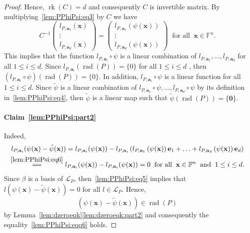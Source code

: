 \documentclass{elsarticle}
\DeclareMathOperator{\rk}{rk}
\DeclareMathOperator{\rad}{rad}
\def\F{{\mathbb F}}
\def\L{{\mathcal L}}
\theoremstyle{definition}
\numberwithin{equation}{section}
\begin{document}
\begin{proof}
Hence, $\rk(C) = d$ and consequently $C$ is invertible matrix. By multiplying~\eqref{lem:PPhiPsi:eq3} by $C$ we have
\[
C^{-1}\begin{pmatrix}
l_{P,\mathbf a_1}(\mathbf x)\\
\vdots\\
l_{P,\mathbf a_d}(\mathbf x)
\end{pmatrix}
=  
\begin{pmatrix}
l_{P,\mathbf a_1}(\psi(\mathbf x))\\
\vdots\\
l_{P,\mathbf a_d} (\psi(\mathbf x))
\end{pmatrix}
\;\;\mbox{for all}\;\;\mathbf x \in \F^n.
\]
This implies that the function $l_{P,\mathbf a_i}\circ \psi$ is a linear combination of $l_{P,\mathbf a_1}, \ldots, l_{P,\mathbf a_d}$ for all $1 \le i \le d$. Since $l_{P,\mathbf a_i}(\rad(P)) = \{0\}$ for all $1 \le i \le d$ , then $\left(l_{P,\mathbf a_i}\circ \psi\right)(\rad(P)) = \{0\}.$ In addition, $l_{P,\mathbf a_i}\circ \psi$ is a linear function for all $1 \le i \le d$. Since  $\tilde{\psi}$ is a linear combination of $l_{P,\mathbf a_1}\circ \psi, \ldots, l_{P,\mathbf a_d}\circ \psi$ by its definition in~\eqref{lem:PPhiPsi:eq4}, then $\tilde{\psi}$ is a linear map such that $\tilde{\psi}(\rad(P)) = \{\mathbf 0\}$.


\paragraph{Claim~\ref{lem:PPhiPsi:part2}} Indeed,
\begin{multline}\label{lem:PPhiPsi:eq5}
l_{P,\mathbf a_i}(\psi (\mathbf x) - \tilde{\psi}(\mathbf x)) = l_{P,\mathbf a_i}(\psi (\mathbf x)) - l_{P,\mathbf a_i}\left( l_{P, \mathbf a_1} \left(\psi(\mathbf x)\right)\mathbf e_1 +  \ldots + l_{P, \mathbf a_d} \left(\psi(\mathbf x)\right)\mathbf e_d\right)\\
 \overset{\eqref{lem:PPhiPsi:eq6}}{=\joinrel=} l_{P,\mathbf a_i}(\psi (\mathbf x)) - l_{P,\mathbf a_i}(\psi (\mathbf x)) = 0\;\;\mbox{for all}\;\;\mathbf x \in \F^n\;\;\mbox{and}\;\; 1 \le i \le d.
\end{multline}
Since $\beta$ is a basis of $\L_P$, then~\eqref{lem:PPhiPsi:eq5} implies that  $l(\psi (\mathbf x) - \tilde{\psi}(\mathbf x)) = 0$ for all $l \in \L_P$. Hence, 
\begin{equation}\label{lem:PPhiPsi:eq8}
\left(\psi (\mathbf x) - \tilde{\psi}(\mathbf x)\right) \in \rad(P)
\end{equation}
by Lemma~\ref{lem:dzeroeqk}\ref{lem:dzeroeqk:part2} and consequently the equality~\eqref{lem:PPhiPsi:eqq6} holds. 


\end{proof}
\end{document}
